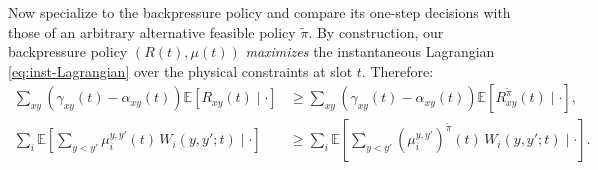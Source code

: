\documentclass[11pt]{article}
\newcommand{\E}{\mathbb{E}}
\begin{document}
Now specialize to the backpressure policy and compare its one-step decisions with those of an arbitrary alternative feasible policy $\tilde{\pi}$. By construction,
our backpressure policy $(R(t),\mu(t))$ \emph{maximizes} the instantaneous Lagrangian \eqref{eq:inst-Lagrangian} over the physical constraints at slot $t$. Therefore:
\begin{align}
\sum_{xy} (\gamma_{xy}(t)-\alpha_{xy}(t))
\E\!\left[R_{xy}(t)\mid\cdot\right]
&\ge
\sum_{xy} (\gamma_{xy}(t)-\alpha_{xy}(t))
\E\!\left[R_{xy}^{\tilde\pi}(t)\mid\cdot\right],
\label{eq:maxweight-service}\\
\sum_i \E\!\left[\sum_{y<y'} \mu_i^{y,y'}(t)\,W_i(y,y';t)\mid\cdot\right]
&\ge
\sum_i \E\!\left[\sum_{y<y'} (\mu_i^{y,y'})^{\tilde\pi}(t)\,W_i(y,y';t)\mid\cdot\right].
\label{eq:maxweight-swap}
\end{align}




\end{document}
